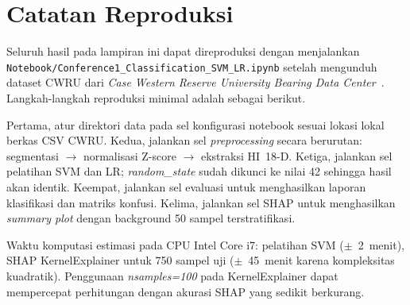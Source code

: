 \section{Catatan Reproduksi}
\label{lamp:svmlr_reproduksi}

Seluruh hasil pada lampiran ini dapat direproduksi dengan menjalankan
\texttt{Notebook/Conference1\_Classification\_SVM\_LR.ipynb} setelah
mengunduh dataset CWRU dari \emph{Case Western Reserve University
Bearing Data Center}~. Langkah-langkah
reproduksi minimal adalah sebagai berikut.

Pertama, atur direktori data pada sel konfigurasi notebook sesuai
lokasi lokal berkas CSV CWRU. Kedua, jalankan sel \emph{preprocessing}
secara berurutan: segmentasi $\to$ normalisasi Z-score $\to$ ekstraksi
HI~18-D. Ketiga, jalankan sel pelatihan SVM dan LR; \emph{random\_state}
sudah dikunci ke nilai 42 sehingga hasil akan identik. Keempat, jalankan
sel evaluasi untuk menghasilkan laporan klasifikasi dan matriks konfusi.
Kelima, jalankan sel SHAP untuk menghasilkan \emph{summary plot} dengan
background 50 sampel terstratifikasi.

Waktu komputasi estimasi pada CPU Intel Core i7: pelatihan SVM ($\pm$~2~menit),
SHAP KernelExplainer untuk 750 sampel uji ($\pm$~45~menit karena kompleksitas
kuadratik). Penggunaan \emph{nsamples=100} pada KernelExplainer dapat
mempercepat perhitungan dengan akurasi SHAP yang sedikit berkurang.
